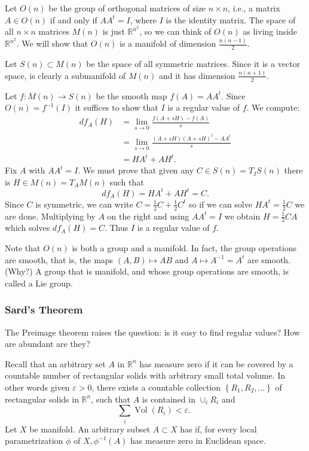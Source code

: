 \documentclass[a4paper]{scrartcl}
\begin{document}
\begin{example}
    Let $O(n)$ be the group of orthogonal matrices of size $n \times n$, i.e., a matrix $A \in O(n)$ if and only if $A A^{t}=I$, where $I$ is the identity matrix. The space of all $n \times n$
matrices $M(n)$ is just $\mathbb{R}^{n^{2}}$, so we can think of $O(n)$ as living inside $\mathbb{R}^{n^{2}}$. We will show that $O(n)$ is a manifold of dimension $\frac{n(n-1)}{2}$.

Let $S(n) \subset M(n)$ be the space of all symmetric matrices. Since it is a vector space, is clearly a submanifold of $M(n)$ and it has dimension $\frac{n(n+1)}{2}$.

Let $f: M(n) \rightarrow S(n)$ be the smooth map $f(A)=A A^{t}$. Since $O(n)=f^{-1}(I)$ it suffices to show that $I$ is a regular value of $f$. We compute:
$$
\begin{aligned}
d f_{A}(H) & =\lim _{s \rightarrow 0} \frac{f(A+s H)-f(A)}{s} \\
& =\lim _{s \rightarrow 0} \frac{(A+s H)(A+s H)^{t}-A A^{t}}{s} \\
& =H A^{t}+A H^{t}.
\end{aligned}
$$
Fix $A$ with $A A^{t}=I$. We must prove that given any $C \in S(n)=T_{I} S(n)$ there is $H \in M(n)=T_{A} M(n)$ such that
$$
d f_{A}(H)=H A^{t}+A H^{t}=C.
$$
Since $C$ is symmetric, we can write $C=\frac{1}{2} C+\frac{1}{2} C^{t}$ so if we can solve $H A^{t}=\frac{1}{2} C$ we are done. Multiplying by $A$ on the right and using $A A^{t}=I$ we obtain $H=\frac{1}{2} C A$ which solves $d f_{A}(H)=C$. Thus $I$ is a regular value of $f$.

Note that $O(n)$ is both a group and a manifold. In fact, the group operations are smooth, that is, the maps $(A, B) \mapsto A B$ and $A \mapsto A^{-1}=A^{t}$ are smooth. (Why?) A group that is manifold, and whose group operations are smooth, is called a Lie group.
\end{example}

\subsubsection{Sard's Theorem}

The Preimage theorem raises the question: is it easy to find regular values? How are abundant are they?

Recall that an arbitrary set $A$ in $\mathbb{R}^{n}$ has measure zero if it can be covered by a countable number of rectangular solids with arbitrary small total volume. In other words given $\varepsilon>0$, there exists a countable collection $\left\{R_{1}, R_{2}, \ldots\right\}$ of rectangular solids in $\mathbb{R}^{n}$, such that $A$ is contained in $\cup_{i} R_{i}$ and
$$
\sum_{i} \operatorname{Vol}\left(R_{i}\right)<\varepsilon \text {. }
$$
Let $X$ be manifold. An arbitrary subset $A \subset X$ has  if, for every local parametrization $\phi$ of $X, \phi^{-1}(A)$ has measure zero in Euclidean space.
\end{document}
